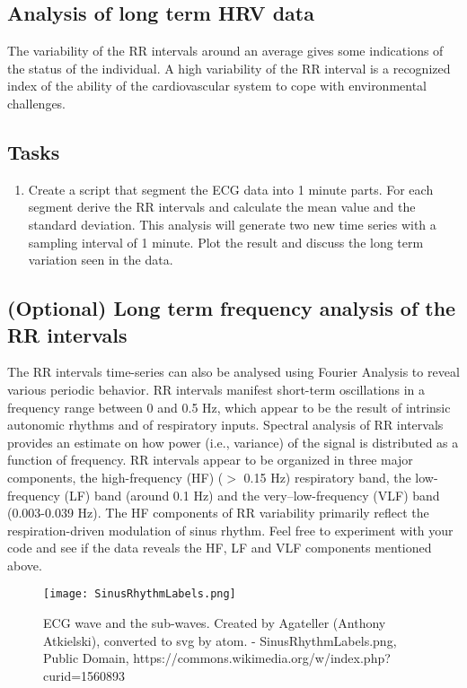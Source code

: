\documentclass[12pt]{article}
\begin{document}
\subsection{Analysis of  long term HRV data}
The variability of the RR intervals around an average gives some
indications of the status of the individual. A high variability of the
RR interval is a recognized index of the ability of the cardiovascular
system to cope with environmental challenges.
\subsection{Tasks}
\begin{enumerate}
\item Create a script that segment the ECG data into 1 minute
  parts. For each segment derive the RR intervals and calculate the
  mean value and the standard deviation. This analysis will generate
  two new time series with a sampling interval of 1 minute. Plot the result and discuss
  the long term variation seen in the data.  
\end{enumerate}

\subsection{(Optional) Long term frequency analysis of the
  RR intervals}
\label{sec:optional-long-term}
The RR intervals time-series can also be analysed using Fourier
Analysis to reveal various periodic behavior. RR intervals manifest
short-term oscillations in a frequency range between 0 and 0.5 Hz,
which appear to be the result of
intrinsic autonomic rhythms and of respiratory inputs. Spectral
analysis of RR intervals provides an estimate on how power (i.e.,
variance) of the signal is distributed as a function of frequency. RR
intervals appear to be organized in three major components, the
high-frequency (HF) ($>$ 0.15 Hz) respiratory band, the low-frequency
(LF) band (around 0.1 Hz) and the very–low-frequency (VLF) band
(0.003-0.039 Hz). The HF components of RR variability primarily
reflect the respiration-driven modulation of sinus rhythm. Feel free
to experiment with your code and see if the data reveals the HF, LF
and VLF components mentioned above. 


\begin{figure}
  \centering
  \texttt{[image: SinusRhythmLabels.png]}
  \caption{ECG wave and the sub-waves. Created by Agateller (Anthony Atkielski), converted to svg by atom. - SinusRhythmLabels.png, Public Domain, https://commons.wikimedia.org/w/index.php?curid=1560893 }  \label{fig:pqrst}
\end{figure}


\label{sec:introduction}


\end{document}

